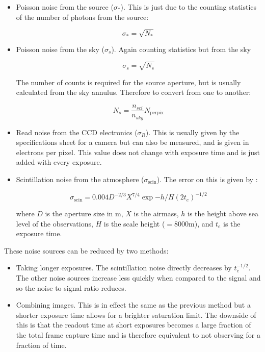 \documentclass[a4paper]{report}
\begin{document}
\begin{itemize}
    \item Poisson noise from the source ($\sigma_{\ast}$). This is 
        just due to the counting statistics of the number of
        photons from the source:

        \[
            \sigma_{\ast} = \sqrt{N_{\ast}}
            \]

    \item Poisson noise from the sky ($\sigma_s$). Again counting 
        statistics but from the sky

        \[
            \sigma_{s} = \sqrt{N_{s}}
            \]

        The number of counts is required for the source aperture, but is
        usually calculated from the sky annulus. Therefore to convert
        from one to another:

        \[
            N_s = \frac{n_{sci}}{n_{sky}} N_{\mathrm{per pix}}
            \]

    \item Read noise from the CCD electronics ($\sigma_R$). This is 
        usually given by the specifications sheet for a camera
        but can also be measured, and is given in electrons per pixel.
        This value does not change with exposure time and is just added
        with every exposure. 

    \item Scintillation noise from the atmosphere
        ($\sigma_{\mathrm{scin}}$). The error on this is given by
        \citet{southworth09}:


        \[
            \sigma_{\mathrm{scin}} = 0.004
            D^{-2/3}X^{7/4}\exp{-h/H}\left(2t_e\right)^{-1/2}
            \label{eq:scintillation}
            \]

        where $D$ is the aperture size in m, $X$ is the airmass, $h$ is
        the height above sea level of the observations, $H$ is the scale
        height ($= 8000$m), and $t_e$ is the exposure time.
\end{itemize}

These noise sources can be reduced by two methods:

\begin{itemize}
    \item Taking longer exposures. The scintillation noise directly
        decreases by $t_e^{-1/2}$. The other noise sources increase less
        quickly when compared to the signal and so the noise to signal
        ratio reduces.
    \item Combining images. This is in effect the same as the previous
        method but a shorter exposure time allows for a brighter
        saturation limit. The downside of this is that the readout time
        at short exposures becomes a large fraction of the total frame
        capture time and is therefore equivalent to not observing for a
        fraction of time.
\end{itemize}
\end{document}
